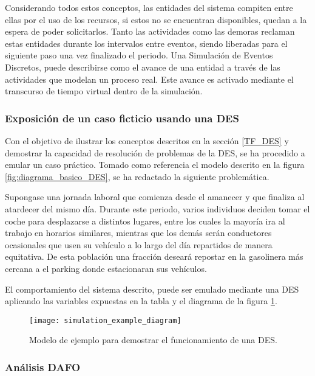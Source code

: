 \documentclass[12pt]{article}
\begin{document}
Considerando todos estos conceptos, las entidades del sistema compiten entre ellas por el uso de los recursos, si estos no se encuentran disponibles, quedan a la espera de poder solicitarlos. Tanto las actividades como las demoras reclaman estas entidades durante los intervalos entre eventos, siendo liberadas para el siguiente paso una vez finalizado el periodo. Una Simulación de Eventos Discretos, puede describirse como el avance de una entidad a través de las actividades que modelan un proceso real. Este avance es activado mediante el transcurso de tiempo virtual dentro de la simulación.

\subsubsection{Exposición de un caso ficticio usando una DES}
Con el objetivo de ilustrar los conceptos descritos en la sección \ref{TF_DES} y demostrar la capacidad de resolución de problemas de la DES, se ha procedido a emular un caso práctico. Tomado como referencia el modelo descrito en la figura \ref{fig:diagrama_basico_DES}, se ha redactado la siguiente problemática.

Supongase una jornada laboral que comienza desde el amanecer y que finaliza al atardecer del mismo día. Durante este periodo, varios individuos deciden tomar el coche para desplazarse a distintos lugares, entre los cuales la mayoría ira al trabajo en horarios similares, mientras que los demás serán conductores ocasionales que usen su vehículo a lo largo del día repartidos de manera equitativa. De esta población una fracción deseará repostar en la gasolinera más cercana a el parking donde estacionaran sus vehículos.

El comportamiento del sistema descrito, puede ser emulado mediante una DES aplicando las variables expuestas en la tabla y el diagrama de la figura \ref{fig:simulation_example_diagram}.

\begin{figure}
    \begin{center}
        \texttt{[image: simulation\_example\_diagram]}
    \end{center}
    \caption{Modelo de ejemplo para demostrar el funcionamiento de una DES.}
    \label{fig:simulation_example_diagram}
\end{figure}

\subsubsection{Análisis DAFO}
\end{document}
